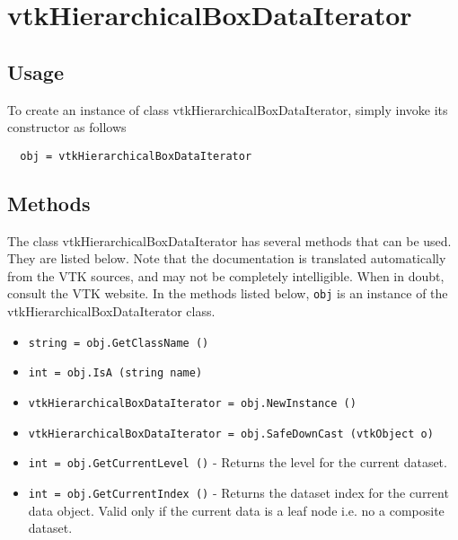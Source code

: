 \section{vtkHierarchicalBoxDataIterator}

\subsection{Usage}


To create an instance of class vtkHierarchicalBoxDataIterator, simply
invoke its constructor as follows
\begin{verbatim}
  obj = vtkHierarchicalBoxDataIterator
\end{verbatim}
\subsection{Methods}

The class vtkHierarchicalBoxDataIterator has several methods that can be used.
  They are listed below.
Note that the documentation is translated automatically from the VTK sources,
and may not be completely intelligible.  When in doubt, consult the VTK website.
In the methods listed below, \verb|obj| is an instance of the vtkHierarchicalBoxDataIterator class.
\begin{itemize}
\item  \verb|string = obj.GetClassName ()|

\item  \verb|int = obj.IsA (string name)|

\item  \verb|vtkHierarchicalBoxDataIterator = obj.NewInstance ()|

\item  \verb|vtkHierarchicalBoxDataIterator = obj.SafeDownCast (vtkObject o)|

\item  \verb|int = obj.GetCurrentLevel ()| -  Returns the level for the current dataset.

\item  \verb|int = obj.GetCurrentIndex ()| -  Returns the dataset index for the current data object. Valid only if the
 current data is a leaf node i.e. no a composite dataset.

\end{itemize}
